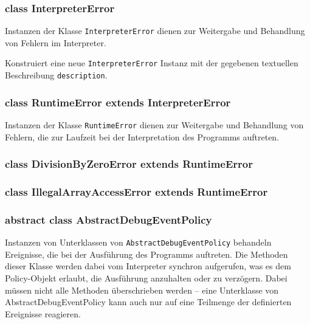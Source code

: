 
\subsubsection{class InterpreterError}
Instanzen der Klasse \texttt{InterpreterError} dienen zur Weitergabe und Behandlung von Fehlern im Interpreter.
\begin{description}
    Konstruiert eine neue \texttt{InterpreterError} Instanz mit der gegebenen textuellen Beschreibung \texttt{description}.
\end{description}

\subsubsection{class RuntimeError extends InterpreterError}
Instanzen der Klasse \texttt{RuntimeError} dienen zur Weitergabe und Behandlung von Fehlern, die zur Laufzeit bei der Interpretation des Programms auftreten.

\subsubsection{class DivisionByZeroError extends RuntimeError}
\subsubsection{class IllegalArrayAccessError extends RuntimeError}

\subsubsection{abstract class AbstractDebugEventPolicy}
Instanzen von Unterklassen von \texttt{AbstractDebugEventPolicy} behandeln Ereignisse, die bei der Ausführung des Programms auftreten. Die Methoden dieser Klasse werden dabei vom Interpreter synchron aufgerufen, was es dem Policy-Objekt erlaubt, die Ausführung anzuhalten oder zu verzögern. Dabei müssen nicht alle Methoden überschrieben werden -- eine Unterklasse von AbstractDebugEventPolicy kann auch nur auf eine Teilmenge der definierten Ereignisse reagieren.

